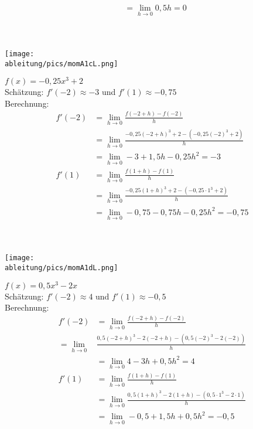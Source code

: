 \begin{Answer}[ref=momA1]
\begin{minipage}{\textwidth}
\begin{minipage}{0.49\textwidth}
\begin{align*}
				&=\lim\limits_{h\to 0}0,5h=0\\
			\end{align*}
		\end{minipage}
	\end{minipage}
	\phantom{text}\\
	\begin{minipage}{\textwidth}
		\begin{minipage}{0.49\textwidth}
			\centering\texttt{[image: \\ableitung/pics/momA1cL.png]}\\
		\end{minipage}
		\begin{minipage}{0.49\textwidth}
			\(f(x)=-0,25x^3+2\)\\
			Schätzung: \(f'(-2)\approx-3\) und \(f'(1)\approx-0,75\)\\
			Berechnung:
			\begin{align*}
				f'(-2)&=\lim\limits_{h\to 0}\frac{f(-2+h)-f(-2)}{h}\\
				&=\lim\limits_{h\to 0}\frac{-0,25(-2+h)^3+2-(-0,25(-2)^3+2)}{h}\\
				&=\lim\limits_{h\to 0}-3+1,5h-0,25h^2=-3\\
				f'(1)&=\lim\limits_{h\to 0}\frac{f(1+h)-f(1)}{h}\\
				&=\lim\limits_{h\to 0}\frac{-0,25(1+h)^3+2-(-0,25\cdot 1^3+2)}{h}\\
				&=\lim\limits_{h\to 0}-0,75-0,75h-0,25h^2=-0,75\\
			\end{align*}
		\end{minipage}
	\end{minipage}
	\phantom{text}\\
	\begin{minipage}{\textwidth}
		\begin{minipage}{0.49\textwidth}
			\centering\texttt{[image: \\ableitung/pics/momA1dL.png]}\\
		\end{minipage}
		\begin{minipage}{0.49\textwidth}
			\(f(x)=0,5x^3-2x\)\\
			Schätzung: \(f'(-2)\approx4\) und \(f'(1)\approx-0,5\)\\
			Berechnung:
			\begin{align*}
				f'(-2)&=\lim\limits_{h\to 0}\frac{f(-2+h)-f(-2)}{h}\\
				=\lim\limits_{h\to 0}&\frac{0,5(-2+h)^3-2(-2+h)-(0,5(-2)^3-2(-2))}{h}\\
				&=\lim\limits_{h\to 0}4-3h+0,5h^2=4\\
				f'(1)&=\lim\limits_{h\to 0}\frac{f(1+h)-f(1)}{h}\\
				&=\lim\limits_{h\to 0}\frac{0,5(1+h)^3-2(1+h)-(0,5\cdot 1^3-2\cdot 1)}{h}\\
				&=\lim\limits_{h\to 0}-0,5+1,5h+0,5h^2=-0,5\\
			\end{align*}
		\end{minipage}
	\end{minipage}
\end{Answer}